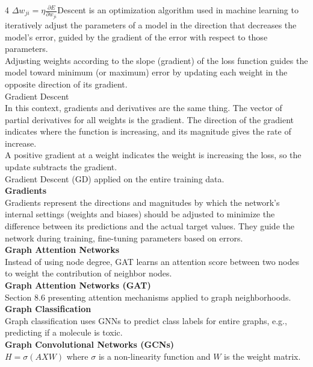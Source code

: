 \documentclass[8pt]{extarticle}
\begin{document}
\begin{multicols}{4}
$ \Delta w_{ji} = \eta \frac{\partial E}{\partial w_{ji}} $\Gradient Descent is an optimization algorithm used in machine learning to iteratively adjust the parameters of a model in the direction that decreases the model's error, guided by the gradient of the error with respect to those parameters.\\
Adjusting weights according to the slope (gradient) of the loss function guides the model toward minimum (or maximum) error by updating each weight in the opposite direction of its gradient.\\
Gradient Descent\\
In this context, gradients and derivatives are the same thing. The vector of partial derivatives for all weights is the gradient. The direction of the gradient indicates where the function is increasing, and its magnitude gives the rate of increase.\\
A positive gradient at a weight indicates the weight is increasing the loss, so the update subtracts the gradient.\\
Gradient Descent (GD) applied on the entire training data.\\
\vspace{2pt}\textbf{Gradients}\\
Gradients represent the directions and magnitudes by which the network's internal settings (weights and biases) should be adjusted to minimize the difference between its predictions and the actual target values. They guide the network during training, fine-tuning parameters based on errors.\\
\vspace{2pt}\textbf{Graph Attention Networks}\\
Instead of using node degree, GAT learns an attention score between two nodes to weight the contribution of neighbor nodes.\\
\vspace{2pt}\textbf{Graph Attention Networks (GAT)}\\
Section 8.6 presenting attention mechanisms applied to graph neighborhoods.\\
\vspace{2pt}\textbf{Graph Classification}\\
Graph classification uses GNNs to predict class labels for entire graphs, e.g., predicting if a molecule is toxic.\\
\vspace{2pt}\textbf{Graph Convolutional Networks (GCNs)}\\
$ H = \sigma(AXW) $ where $\sigma$ is a non-linearity function and $W$ is the weight matrix.\\

\end{multicols}
\end{document}
